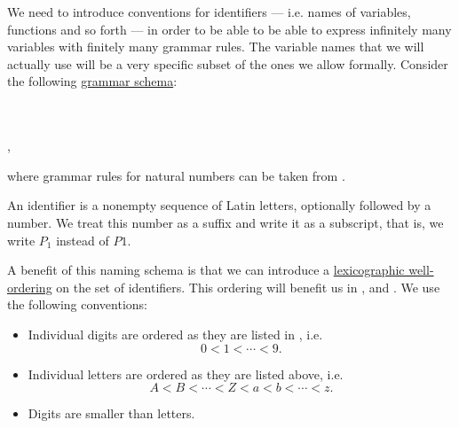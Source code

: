 \begin{remark}\label{rem:grammar_rules_for_variables}
  We need to introduce conventions for identifiers --- i.e. names of variables, functions and so forth --- in order to be able to be able to express infinitely many variables with finitely many grammar rules. The variable names that we will actually use will be a very specific subset of the ones we allow formally. Consider the following \hyperref[rem:backus_normal_form]{grammar schema}:
  \begin{bnf*}
           { \bnfor {} \bnfor \cdots \bnfor {} \bnfor {} \bnfor {} \bnfor \cdots \bnfor {}} \\
             { \bnfor {} \bnfsp {}} \\
       { \bnfor {} \bnfsp {}},
  \end{bnf*}
  where grammar rules for natural numbers can be taken from .

  An identifier is a nonempty sequence of Latin letters, optionally followed by a number. We treat this number as a suffix and write it as a subscript, that is, we write \( P_1 \) instead of \( P1 \).

  A benefit of this naming schema is that we can introduce a \hyperref[thm:well_ordered_lexicographic_order_is_well_ordered]{lexicographic well-ordering} on the set of identifiers. This ordering will benefit us in ,  and . We use the following conventions:
  \begin{itemize}
    \item Individual digits are ordered as they are listed in , i.e.
    \begin{equation*}
      0 < 1 < \cdots < 9.
    \end{equation*}

    \item Individual letters are ordered as they are listed above, i.e.
    \begin{equation*}
      A < B < \cdots < Z < a < b < \cdots < z.
    \end{equation*}

    \item Digits are smaller than letters.


\end{itemize}
\end{remark}
